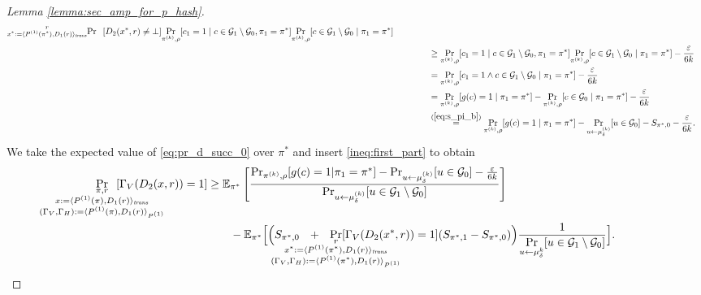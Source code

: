 \begin{proof}[Lemma \ref{lemma:sec_amp_for_p_hash}]
\begin{align}
{{    \substack{r \\
      x^* := \langle P^{(1)}(\pi^*), D_1(r) \rangle_{\mathit{trans}}}}}
  {\Pr}\mkern13mu[D_2(x^*,r) \neq \bot]
  \underset{\pi^{(k)}, \rho}{\Pr}[c_1 = 1 \mid c \in \mathcal{G}_1 \setminus \mathcal{G}_0, \pi_1 = \pi^*]
  \underset{\pi^{(k)}, \rho}{\Pr}[c \in \mathcal{G}_1 \setminus \mathcal{G}_0 \mid \pi_1 = \pi^*] \notag\\
  &\mbox\qquad\qquad \geq \underset{\pi^{(k)}, \rho}{\Pr}[c_1 = 1 \mid c \in \mathcal{G}_1 \setminus \mathcal{G}_0, \pi_1 = \pi^*]\underset{\pi^{(k)}, \rho}
  {\Pr}[c \in \mathcal{G}_1 \setminus \mathcal{G}_0 \mid \pi_1 = \pi^*] - \frac{\varepsilon}{6k} \notag\\
  &\mbox\qquad\qquad = \underset{\pi^{(k)}, \rho}{\Pr}[c_1 = 1 \land c \in \mathcal{G}_1 \setminus \mathcal{G}_0 \mid \pi_1 = \pi^*] - \frac{\varepsilon}{6k} \notag\\
  &\mbox\qquad\qquad = \underset{\pi^{(k)}, \rho}{\Pr}[g(c) = 1 \mid \pi_1 = \pi^*] -  \underset{\pi^{(k)}, \rho}{\Pr}[c \in \mathcal{G}_0 \mid \pi_1 = \pi^*] - \frac{\varepsilon}{6k} \notag\\
  &\mbox\qquad\qquad \stackrel{(\ref{eq:s_pi_b})}{=}
   \underset{\pi^{(k)}, \rho}{\Pr}[g(c) = 1 \mid \pi_1 = \pi^*] -  \underset{u \leftarrow \mu_{\delta}^{(k)}}{\Pr}[u \in \mathcal{G}_0]  - S_{\pi^*,0} - \frac{\varepsilon}{6k}.
\end{align}
We take the expected value of \eqref{eq:pr_d_succ_0} over $\pi^*$ and insert \eqref{ineq:first_part} to obtain
\begin{align}
  \label{ineq:ex_pr_gamma}
\underset{
  \mathclap{
    \substack{\pi, r \\ x := \langle P^{(1)}(\pi), D_1(r) \rangle_{\mathit{trans}} \\ (\Gamma_V, \Gamma_H) := \langle P^{(1)}(\pi), D_1(r) \rangle_{P^{(1)}} }}}
{\Pr}\mkern13mu[\Gamma_V(D_2(x, r)) = 1]
&\geq \mathbb{E}_{\pi^*}\left[\frac{\Pr_{\pi^{(k)}, \rho}[g(c) = 1 | \pi_1 = \pi^*]
  - \Pr_{u \leftarrow \mu_{\delta}^{(k)}}[u \in \cG_0] - \frac{\epsilon}{6k}}{\Pr_{u \leftarrow \mu_{\delta}^{(k)}}[u \in \cG_1 \setminus \cG_0]}\right] \notag\\
&\IndI - \mathbb{E}_{\pi^*}\Bigl[\Bigl(S_{\pi^*,0} \mkern13mu + \mkern13mu
\underset{\mathclap{
  \substack{r \\ x^* := \langle P^{(1)}(\pi^*), D_1(r) \rangle_{\mathit{trans}} \\ (\Gamma_V, \Gamma_H) := \langle P^{(1)}(\pi^*), D_1(r) \rangle_{P^{(1)}} }}}
{\Pr}[\Gamma_V(D_2(x^*, r)) = 1](S_{\pi^*,1} - S_{\pi^*,0})\Bigr)
\frac{1}{\underset{u \leftarrow \mu_{\delta}^k}{\Pr}[ u \in \cG_1 \setminus\cG_0]}\Bigr].
\end{align}

\end{proof}

